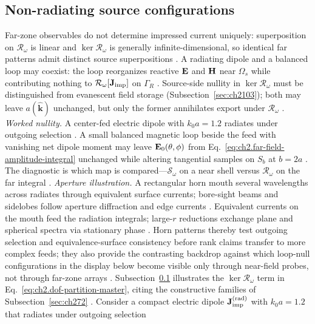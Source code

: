 \subsection{Non-radiating source configurations}
\label{sec:ch2102}

Far-zone observables do not determine impressed current uniquely: superposition on
$\mathcal{R}_\omega$ is linear and $\ker\mathcal{R}_\omega$ is generally infinite-dimensional, so
identical far patterns admit distinct source superpositions \cite{harrington2001,devaney2004}. A
radiating dipole and a balanced loop may coexist: the loop reorganizes reactive $\mathbf{E}$ and $\mathbf{H}$ near
$\Omega_s$ while contributing nothing to $\mathcal{R}_\omega[\mathbf{J}_{\mathrm{imp}}]$ on $\Gamma_R$
\cite{devaney2004,stratton1941}. Source-side nullity in $\ker\mathcal{R}_\omega$ must be
distinguished from evanescent field storage (Subsection~\ref{sec:ch2103}); both may leave
$a(\widehat{\mathbf{k}})$ unchanged, but only the former annihilates export under
$\mathcal{R}_\omega$ \cite{stratton1941}.
\emph{Worked nullity.} A center-fed electric dipole with $k_0 a=1.2$ radiates under outgoing
selection \cite{stratton1941}. A small balanced magnetic loop beside the feed with vanishing net
dipole moment may leave $\mathbf{E}_0(\theta,\phi)$ from Eq.~\eqref{eq:ch2.far-field-amplitude-integral}
unchanged while altering tangential samples on $S_b$ at $b=2a$ \cite{devaney2004}. The diagnostic
is which map is compared---$\mathcal{S}_\omega$ on a near shell versus $\mathcal{R}_\omega$ on the
far integral \cite{hansen1988}.
\emph{Aperture illustration.} A rectangular horn mouth several wavelengths across radiates through
equivalent surface currents; bore-sight beams and sidelobes follow aperture diffraction and edge
currents \cite{collin2001,stratton1941}. Equivalent currents on the mouth feed the radiation
integrals; large-$r$ reductions exchange plane and spherical spectra via stationary phase
\cite{harrington2001}. Horn patterns thereby test outgoing selection and equivalence-surface
consistency before rank claims transfer to more complex feeds; they also provide
the contrasting backdrop against which loop-null configurations in the display below become
visible only through near-field probes, not through far-zone arrays \cite{maxwell1873}.
Subsection~\ref{sec:ch2102} illustrates the \(\ker\mathcal{R}_\omega\) term in
Eq.~\eqref{eq:ch2.dof-partition-master}, citing the constructive families of
Subsection~\ref{sec:ch272} \cite{stratton1941}. Consider a compact electric dipole
\(\mathbf{J}_{\mathrm{imp}}^{(\mathrm{rad})}\) with \(k_0 a=1.2\) that radiates under outgoing selection
